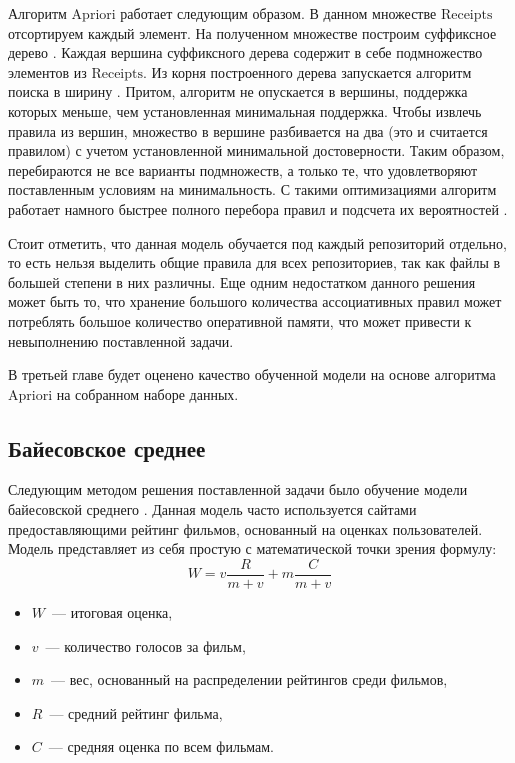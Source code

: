 Алгоритм Apriori работает следующим образом. В данном множестве $\text{Receipts}$ отсортируем каждый элемент. На полученном множестве построим суффиксное дерево \cite{trie}. Каждая вершина суффиксного дерева содержит в себе подмножество элементов из $\text{Receipts}$. Из корня построенного дерева запускается алгоритм поиска в ширину \cite{alghorithms}. Притом, алгоритм не опускается в вершины, поддержка которых меньше, чем установленная минимальная поддержка. Чтобы извлечь правила из вершин, множество в вершине разбивается на два (это и считается правилом) с учетом установленной минимальной достоверности. Таким образом, перебираются не все варианты подмножеств, а только те, что удовлетворяют поставленным условиям на минимальность. С такими оптимизациями алгоритм работает намного быстрее полного перебора правил и подсчета их вероятностей \cite{apriori}. 

Стоит отметить, что данная модель обучается под каждый репозиторий отдельно, то есть нельзя выделить общие правила для всех репозиториев, так как файлы в большей степени в них различны. Еще одним недостатком данного решения может быть то, что хранение большого количества ассоциативных правил может потреблять большое количество оперативной памяти, что может привести к невыполнению поставленной задачи.

В третьей главе будет оценено качество обученной модели на основе алгоритма Apriori на собранном наборе данных.
    \subsection{Байесовское среднее}\label{chapter-2-bayes}
Следующим методом решения поставленной задачи было обучение модели байесовской среднего \cite{bayesian-average}. Данная модель часто используется сайтами предоставляющими рейтинг фильмов, основанный на оценках пользователей. Модель представляет из себя простую с математической точки зрения формулу:
    \begin{equation}\label{bayes-formula}
        W = v\frac{R}{m + v} + m\frac{C}{m + v}    
    \end{equation}

    \begin{itemize}
        \item $W$~--- итоговая оценка,
        \item $v$~--- количество голосов за фильм,
        \item $m$~--- вес, основанный на распределении рейтингов среди фильмов,
        \item $R$~--- средний рейтинг фильма,
        \item ${C}$~--- средняя оценка по всем фильмам.
    \end{itemize}

